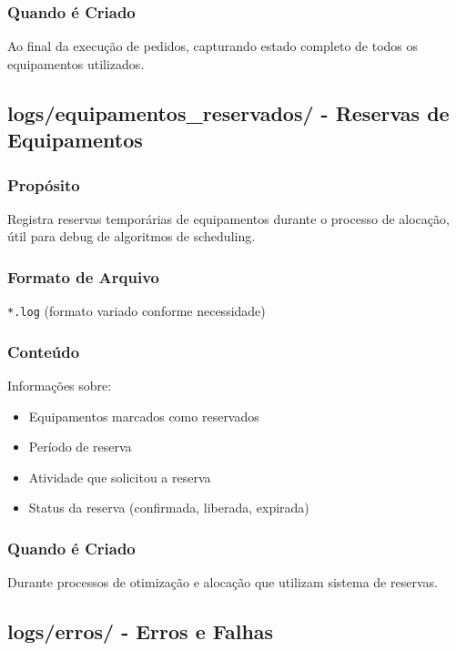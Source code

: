 \documentclass[11pt,a4paper]{article}
\begin{document}
\subsubsection{Quando é Criado}

Ao final da execução de pedidos, capturando estado completo de todos os equipamentos utilizados.

\subsection{logs/equipamentos\_reservados/ - Reservas de Equipamentos}

\subsubsection{Propósito}

Registra reservas temporárias de equipamentos durante o processo de alocação, útil para debug de algoritmos de scheduling.

\subsubsection{Formato de Arquivo}

\texttt{*.log} (formato variado conforme necessidade)

\subsubsection{Conteúdo}

Informações sobre:
\begin{itemize}
    \item Equipamentos marcados como reservados
    \item Período de reserva
    \item Atividade que solicitou a reserva
    \item Status da reserva (confirmada, liberada, expirada)
\end{itemize}

\subsubsection{Quando é Criado}

Durante processos de otimização e alocação que utilizam sistema de reservas.

\subsection{logs/erros/ - Erros e Falhas}
\end{document}
